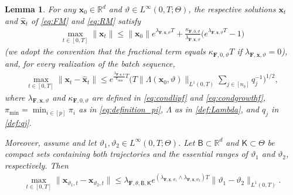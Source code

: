 \documentclass[twoside,11pt]{article}
\theoremstyle{plain}
\newtheorem{lemma}[theorem]{Lemma}
\def\R{\mathbb R}
\newcommand{\bfF}{\mathbf{F}}
\newcommand{\bfx}{\mathbf{x}}
\begin{document}
\begin{lemma}\label{lem:estimation}
For any $\bfx_0\in \R^d$ and $\vartheta\in L^\infty(0,T;\Theta)$, the respective solutions $\bfx_t$ and $\hat{\bfx}_t$ of \eqref{eq:FM} and \eqref{eq:RM} satisfy
\begin{align}\label{eq:estimation_x}
\max_{t\in[0,T]}\|\bfx_t\|\leq \|\bfx_{0}\|e^{\lambda_{\bfF,\bfx,\vartheta} T}+\frac{\kappa_{\bfF,0,\vartheta}}{\lambda_{\bfF,\bfx,\vartheta}}\bigl(e^{\lambda_{\bfF,\bfx,\vartheta} T}-1\bigr)
\end{align}
(we adopt the convention that the fractional term equals $\kappa_{\bfF,0,\vartheta}T$ if $\lambda_{\bfF,\bfx,\vartheta}=0$), and, for every realization of the batch sequence,
\begin{align}\label{eq:alignpropest2}
\max_{t\in[0,T]}\|\bfx_t - \hat{\bfx}_t\| 
\leq e^{\frac{\lambda_{\bfF,\bfx,\vartheta}}{\pi_{\text{min}}} T}\Big(T\|\Lambda(\bfx_0,\vartheta)\|_{L^1(0,T)}\sum_{j\in[n_b]}q_j^{-1}\Big)^{1/2},
\end{align}
where $\lambda_{\bfF,\bfx,\vartheta}$ and $\kappa_{\bfF,0,\vartheta}$ are defined in \eqref{eq:condlipf} and \eqref{eq:condgrowthf}, $\pi_{\text{min}}=\min_{i\in[p]}\pi_i$ as in \eqref{eq:definition_pi}, $\Lambda$ as in \eqref{def:Lambda}, and $q_j$ in \eqref{def:qj}. 


Moreover, assume  and let
$\vartheta_1,\vartheta_2\in L^\infty(0,T;\Theta)$. Let
$\mathsf B\subset\R^d$ and $\mathsf K\subset\Theta$ be compact sets containing both trajectories and the essential ranges of $\vartheta_{1}$ and $\vartheta_{2}$, respectively. Then
\begin{align}\label{eq:constant_lip_x}
\max_{t\in[0,T]}
\|\bfx_{\vartheta_1,t}-\bfx_{\vartheta_2,t}\|
\le
\lambda_{\bfF,\theta,\mathsf B,\mathsf K}
e^{(\lambda_{\bfF,\bfx,\vartheta_1}\wedge
\lambda_{\bfF,\bfx,\vartheta_2})T}
\|\vartheta_1-\vartheta_2\|_{L^1(0,T)}.
\end{align}
\end{lemma}
\end{document}
